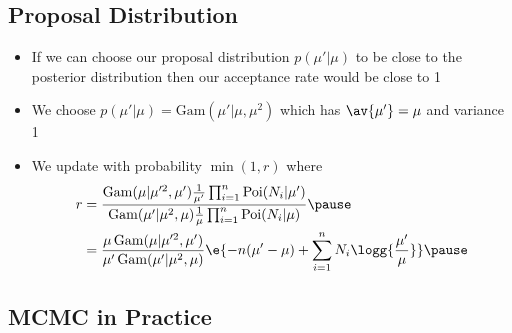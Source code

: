
\begin{slide}
\section[-2]{Proposal Distribution}

\begin{PauseHighLight}
  \begin{itemize}
  \item If we can choose our proposal distribution $p(\mu'|\mu)$ to be
    close to the posterior distribution then our acceptance rate would
    be close to 1\pause
  \item We choose $p(\mu'|\mu) = \mathrm{Gam}(\mu'|\mu,\mu^2)$ which has
    $\av{\mu'}=\mu$ and variance 1\pause
  \item We update with probability $\min(1,r)$ where
  \begin{align*}
    r &= \frac{\mathrm{Gam}(\mu|\mu^{\prime2},\mu')
        \tfrac{1}{\mu'} \prod_{i=1}^n \mathrm{Poi}(N_i|\mu')}
        {\mathrm{Gam}(\mu'|\mu^2,\mu) \tfrac{1}{\mu}
        \prod_{i=1}^n \mathrm{Poi}(N_i|\mu)}\pause
    \\
      &= \frac{\mu\,\mathrm{Gam}(\mu|\mu^{\prime2},\mu')}
        {\mu'\,\mathrm{Gam}(\mu'|\mu^2,\mu)}
        \e{- n (\mu'-\mu) + \sum\limits_{i=1}^n N_i \logg{
        \frac{\mu'}{\mu}}}\pause
  \end{align*}
\end{itemize}
\end{PauseHighLight}

\end{slide}


\begin{slide}
\section{MCMC in Practice}

\pause
\pb
{}
\begin{center}
  \pause
\end{center}
\end{slide}


